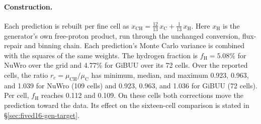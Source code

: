 \paragraph{Construction.} Each prediction is rebuilt per fine cell as $x_{\mathrm{CH}}=\tfrac{12}{13}\,x_{\mathrm{C}}+\tfrac{1}{13}\,x_{\mathrm{H}}$. Here $x_{\mathrm{H}}$ is the generator's own free-proton product, run through the unchanged conversion, flux-repair and binning chain. Each prediction's Monte Carlo variance is combined with the squares of the same weights. The hydrogen fraction is $f_{\mathrm{H}}=5.08\%$ for NuWro over the grid and 4.77\% for GiBUU over its 72 cells. Over the reported cells, the ratio $r_{c}=\mu_{\mathrm{CH}}/\mu_{\mathrm{C}}$ has minimum, median, and maximum 0.923, 0.963, and 1.039 for NuWro (109 cells) and 0.923, 0.963, and 1.036 for GiBUU (72 cells). Per cell, $f_{\mathrm{H}}$ reaches 0.112 and 0.109.  On these cells both corrections move the prediction toward the data. Its effect on the sixteen-cell comparison is stated in \S\ref{sec:fived16-gen-target}.

